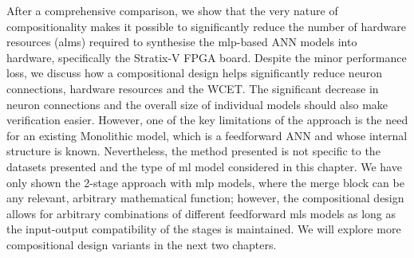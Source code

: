 After a comprehensive comparison, we show that the very nature of compositionality makes it possible to significantly reduce the number of hardware resources (\glspl{alm}) required to synthesise the \gls{mlp}-based ANN models into hardware, specifically the Stratix-V FPGA board. Despite the minor performance loss, we discuss how a compositional design helps significantly reduce neuron connections, hardware resources and the WCET. The significant decrease in neuron connections and the overall size of individual models should also make verification easier. However, one of the key limitations of the approach is the need for an existing Monolithic model, which is a feedforward ANN and whose internal structure is known. Nevertheless, the method presented is not specific to the datasets presented and the type of \gls{ml} model considered in this chapter. We have only shown the 2-stage approach with \gls{mlp} models, where the merge block can be any relevant, arbitrary mathematical function; however, the compositional design allows for arbitrary combinations of different feedforward \glspl{ml} models as long as the input-output compatibility of the stages is maintained. We will explore more compositional design variants in the next two chapters. 







